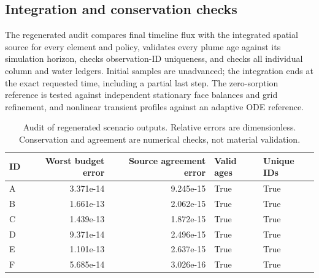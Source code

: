 \subsection{Integration and conservation checks}
The regenerated audit compares final timeline flux with the integrated spatial source for every element and policy, validates every plume age against its simulation horizon, checks observation-ID uniqueness, and checks all individual column and water ledgers. Initial samples are unadvanced; the integration ends at the exact requested time, including a partial last step. The zero-sorption reference is tested against independent stationary face balances and grid refinement, and nonlinear transient profiles against an adaptive ODE reference.
\begin{table}[htbp]\centering\small
\caption{Audit of regenerated scenario outputs. Relative errors are dimensionless. Conservation and agreement are numerical checks, not material validation.}\label{tab:scenario-audit}
\begin{tabular}{lrrll}\toprule
ID & Worst budget error & Source agreement error & Valid ages & Unique IDs \\
\midrule
A & 3.371e-14 & 9.245e-15 & True & True \\
B & 1.661e-13 & 2.062e-15 & True & True \\
C & 1.439e-13 & 1.872e-15 & True & True \\
D & 9.371e-14 & 2.496e-15 & True & True \\
E & 1.101e-13 & 2.637e-15 & True & True \\
F & 5.685e-14 & 3.026e-16 & True & True \\
\bottomrule\end{tabular}\end{table}


